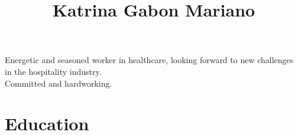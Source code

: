 \documentclass[11pt]{article} %
\begin{document}
{\selectfont



\hspace{-1.2em}\title{ Katrina Gabon Mariano } %

\noindent\begin{minipage}[t]{0.70\textwidth}
\vspace{0.5em}

Energetic and seasoned worker in healthcare, looking forward to new challenges in the hospitality industry.  \\

Committed and hardworking.




	\section{Education}

%



%


\end{minipage}}
\end{document}

